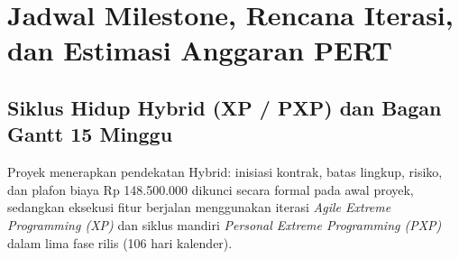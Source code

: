 \documentclass[11pt,a4paper]{article}
\begin{document}
\section{Jadwal Milestone, Rencana Iterasi, dan Estimasi Anggaran PERT}

\subsection{Siklus Hidup Hybrid (XP / PXP) dan Bagan Gantt 15 Minggu}
Proyek menerapkan pendekatan Hybrid: inisiasi kontrak, batas lingkup, risiko, dan plafon biaya Rp 148.500.000 dikunci secara formal pada awal proyek, sedangkan eksekusi fitur berjalan menggunakan iterasi \textit{Agile Extreme Programming (XP)} dan siklus mandiri \textit{Personal Extreme Programming (PXP)} dalam lima fase rilis (106 hari kalender).
\end{document}

